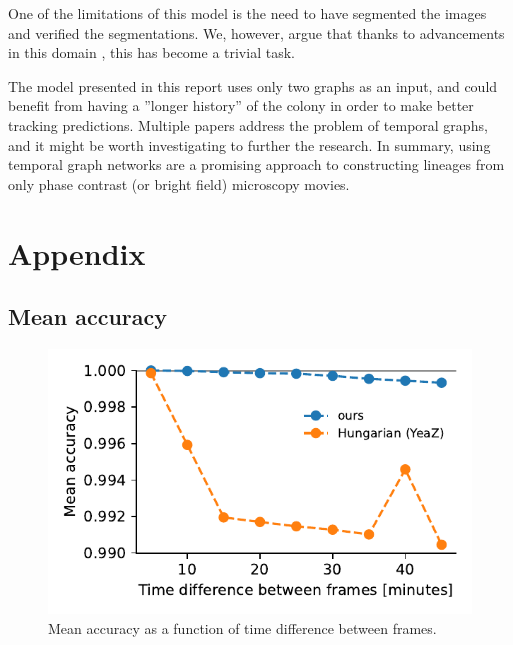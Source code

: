 \documentclass[10pt,conference,compsocconf,a4paper]{IEEEtran}
\begin{document}
	One of the limitations of this model is the need to have segmented the images and verified the segmentations. We, however, argue that thanks to advancements in this domain \cite{dietler_convolutional_2020,stringer_cellpose_2020}, this has become a trivial task. 

	The model presented in this report uses only two graphs as an input, and could benefit from having a ''longer history'' of the colony in order to make better tracking predictions. Multiple papers \cite{singer_node_2019,jin_recurrent_2020,rossi_temporal_2020} address the problem of temporal graphs, and it might be worth investigating to further the research.
	In summary, using temporal graph networks are a promising approach to constructing lineages from only phase contrast (or bright field) microscopy movies.
	

\newpage



\newpage

\section{Appendix}

	\subsection{Mean accuracy}

	\begin{figure}[h!]
		\centering
		\includegraphics[width=\linewidth]{figures/timediff_mean_accuracy.pdf}
		\caption{Mean accuracy as a function of time difference between frames.}
		\label{fig:mean_acc}
	\end{figure}
\end{document}
